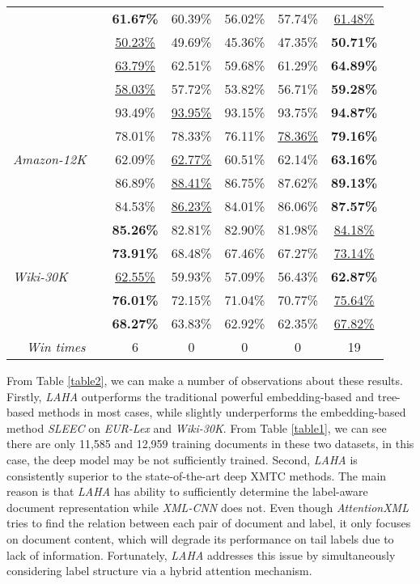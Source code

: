 \documentclass[runningheads]{llncs}
\begin{document}
\begin{table}[t]
\begin{tabular}{l|c|c|c|c|c|c}
		&  & \textbf{61.67\%}& 60.39\% &56.02\% & 57.74\% &  \underline{61.48\%}	  \\
		&  & \underline{50.23\%}& 49.69\% &45.36\% & 47.35\% &  \textbf{50.71\%} 	 \\ \cline{2-7}
		&  & \underline{63.79\%}& 62.51\% &59.68\% & 61.29\% &  \textbf{64.89\%}	  \\
		&  & \underline{58.03\%}& 57.72\% &53.82\% & 56.71\% &  \textbf{59.28\%} 	 \\ \hline \hline
		\multirow{5}{*}{\textit{Amazon-12K}}	 & & 93.49\%& \underline{93.95\%} &93.15\% & 93.75\% &  \textbf{94.87\%} 	  \\ 
&  & 78.01\%& 78.33\% & 76.11\%& \underline{78.36\%} &  \textbf{79.16\%}	 \\
&  & 62.09\%& \underline{62.77\%} &60.51\% & 62.14\% &  \textbf{63.16\%} 	  \\ \cline{2-7}
&  & 86.89\%& \underline{88.41\%}& 86.75\%& 87.62\% &  \textbf{89.13\%}	 \\
&  & 84.53\%& \underline{86.23\%} &84.01\% & 86.06\% &  \textbf{87.57\%} 	  \\ \hline	\hline
		\multirow{5}{*}{\textit{Wiki-30K}}	 & & \textbf{85.26\%}& 82.81\% & 82.90\%& 81.98\% &  \underline{84.18\%} 	  \\ 
		&  & \textbf{73.91\%}& 68.48\% & 67.46\%& 67.27\% & \underline{73.14\%} 	 \\
		&  & \underline{62.55\%}& 59.93\% &57.09\% & 56.43\% &  \textbf{62.87\%} 	  \\ \cline{2-7}
		&  & \textbf{76.01\%}& 72.15\% & 71.04\%& 70.77\% & \underline{75.64\%} 	 \\
		&  & \textbf{68.27\%}& 63.83\% & 62.92\%& 62.35\% & \underline{67.82\%} 	  \\ \hline\hline
\multicolumn{2}{c|}{\textit{Win times}} & 6 & 0&0&0 & 19\\
		\hline	
	\end{tabular}
\end{table}

From Table \ref{table2}, we can make a number of observations about these results. Firstly, \textit{LAHA} outperforms the traditional powerful embedding-based and tree-based methods in most cases, while slightly underperforms the embedding-based method \textit{SLEEC} on \textit{EUR-Lex} and \textit{Wiki-30K}. From Table \ref{table1}, we can see there are only 11,585 and 12,959 training documents in these two datasets, in this case, the deep model may be not sufficiently trained.
Second, \textit{LAHA} is consistently superior to the state-of-the-art deep XMTC methods. The main reason is that \textit{LAHA} has ability to sufficiently determine the label-aware document representation while \textit{XML-CNN} does not. Even though \textit{AttentionXML} tries to find the relation between each pair of document and label, it only focuses on document content, which will degrade its performance on tail labels due to lack of information. Fortunately, \textit{LAHA} addresses this issue by simultaneously considering label structure via a hybrid attention mechanism. 
\end{document}
